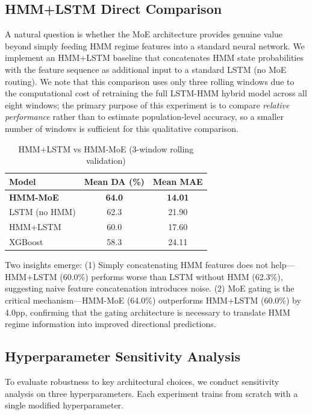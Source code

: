 \documentclass[3p,times]{elsarticle}
\begin{document}
\subsection{HMM+LSTM Direct Comparison}
\label{sec:hmmlstm}

A natural question is whether the MoE architecture provides genuine value beyond simply feeding HMM regime features into a standard neural network. We implement an HMM+LSTM baseline that concatenates HMM state probabilities with the feature sequence as additional input to a standard LSTM (no MoE routing). We note that this comparison uses only three rolling windows due to the computational cost of retraining the full LSTM-HMM hybrid model across all eight windows; the primary purpose of this experiment is to compare \textit{relative performance} rather than to estimate population-level accuracy, so a smaller number of windows is sufficient for this qualitative comparison.

\begin{table}[htbp]
\centering
\caption{HMM+LSTM vs HMM-MoE (3-window rolling validation)}
\label{tab:hmmlstm}
\begin{tabular}{lcc}
\toprule
Model & Mean DA (\%) & Mean MAE \\
\midrule
\textbf{HMM-MoE} & \textbf{64.0} & \textbf{14.01} \\
LSTM (no HMM) & 62.3 & 21.90 \\
HMM+LSTM & 60.0 & 17.60 \\
XGBoost & 58.3 & 24.11 \\
\bottomrule
\end{tabular}
\end{table}

Two insights emerge: (1) Simply concatenating HMM features does not help---HMM+LSTM (60.0\%) performs worse than LSTM without HMM (62.3\%), suggesting naive feature concatenation introduces noise. (2) MoE gating is the critical mechanism---HMM-MoE (64.0\%) outperforms HMM+LSTM (60.0\%) by 4.0pp, confirming that the gating architecture is necessary to translate HMM regime information into improved directional predictions.

\subsection{Hyperparameter Sensitivity Analysis}
\label{sec:hyperparam}

To evaluate robustness to key architectural choices, we conduct sensitivity analysis on three hyperparameters. Each experiment trains from scratch with a single modified hyperparameter.
\end{document}
